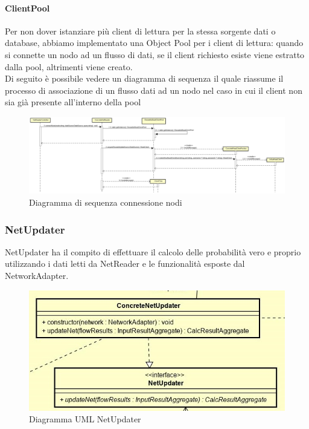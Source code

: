 \paragraph{ClientPool}\Spazio
Per non dover istanziare più client di lettura per la stessa sorgente dati o database, abbiamo implementato una Object Pool per i client di lettura: quando si connette un nodo ad un flusso di dati, se il client richiesto esiste viene estratto dalla pool, altrimenti viene creato.\\
Di seguito è possibile vedere un diagramma di sequenza il quale riassume il processo di associazione di un flusso dati ad un nodo nel caso in cui il client non sia già presente all'interno della pool
\begin{figure} [H]
	\centerline{
	\includegraphics[scale=0.23]{Img/ConnessioneNodi}}
	\caption{Diagramma di sequenza connessione nodi}\label{}
\end{figure}
\subsubsection{NetUpdater}
NetUpdater ha il compito di effettuare il calcolo delle probabilità vero e proprio utilizzando i dati letti da NetReader e le funzionalità esposte dal NetworkAdapter.
\begin{figure} [H]
	\centering
	\includegraphics[scale=0.8]{Img/NetUpdater}
	\caption{Diagramma UML NetUpdater}\label{}
\end{figure}
